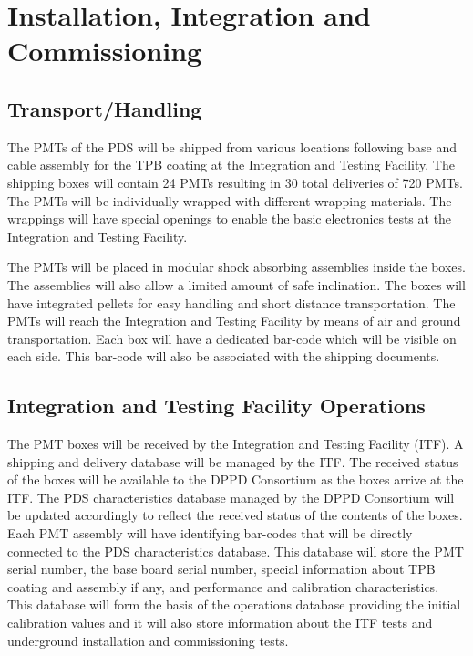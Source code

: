 \section{Installation, Integration and Commissioning}
\label{sec:fddp-pd-9}

\subsection{Transport/Handling}
\label{sec:fddp-pd-9.1}

The PMTs of the PDS will be shipped from various locations following base and cable assembly for the TPB coating at the Integration and Testing Facility. The shipping boxes will contain \num{24} PMTs resulting in \num{30} total deliveries of \num{720} PMTs. The PMTs will be individually wrapped with different wrapping materials. The wrappings will have special openings to enable the basic electronics tests at the Integration and Testing Facility.

The PMTs will be placed in modular shock absorbing assemblies inside the boxes. The assemblies will also allow a limited amount of safe inclination. The boxes will have integrated pellets for easy handling and short distance transportation. The PMTs will reach the Integration and Testing Facility by means of air and ground transportation. Each box will have a dedicated bar-code which will be visible on each side. This bar-code will also be associated with the shipping documents. 

\subsection{Integration and Testing Facility Operations}
\label{sec:fddp-pd-9.2}

The PMT boxes will be received by the Integration and Testing Facility (ITF). A shipping and delivery database will be managed by the ITF. The received status of the boxes will be available to the DPPD Consortium as the boxes arrive at the ITF. The PDS characteristics database managed by the DPPD Consortium will be updated accordingly to reflect the received status of the contents of the boxes. Each PMT assembly will have identifying bar-codes that will be directly connected to the PDS characteristics database. This database will store the PMT serial number, the base board serial number, special information about TPB coating and assembly if any, and performance and calibration characteristics. This database will form the basis of the operations database providing the initial calibration values and it will also store information about the ITF tests and underground installation and commissioning tests.

